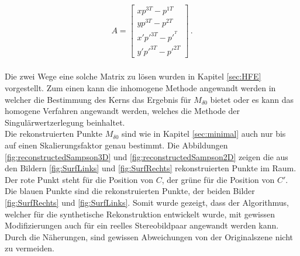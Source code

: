 
\begin{gather}
A = \begin{bmatrix}
xp^{3T}-p^{1T}\\
yp^{3T}-p^{2T}\\
x'p'^{3T}-p'^{^T}\\
y'p'^{3T}-p'^{2T}
\end{bmatrix} \, .
\end{gather}\\

Die zwei Wege eine solche Matrix zu lösen wurden in Kapitel \ref{sec:HFE} vorgestellt. Zum einen kann die inhomogene Methode angewandt werden in welcher die Bestimmung des Kerns das Ergebnis für $M_{\delta 0}$ bietet oder es kann das homogene Verfahren angewandt werden, welches die Methode der Singulärwertzerlegung beinhaltet. \\

Die rekonstruierten Punkte $M_{\delta 0}$ sind wie in Kapitel \ref{sec:minimal} auch nur bis auf einen Skalierungsfaktor genau bestimmt. Die Abbildungen \ref{fig:reconstructedSampson3D} und \ref{fig:reconstructedSampson2D} zeigen die aus den Bildern \ref{fig:SurfLinks} und \ref{fig:SurfRechts} rekonstruierten Punkte im Raum. Der rote Punkt steht für die Position von $C$, der grüne für die Position von $C'$. Die blauen Punkte sind die rekonstruierten Punkte, der beiden Bilder \ref{fig:SurfRechts} und \ref{fig:SurfLinks}. Somit wurde gezeigt, dass der Algorithmus, welcher für die synthetische Rekonstruktion entwickelt wurde, mit gewissen Modifizierungen auch für ein reelles Stereobildpaar angewandt werden kann. Durch die Näherungen, sind gewissen Abweichungen von der Originalszene nicht zu vermeiden.


